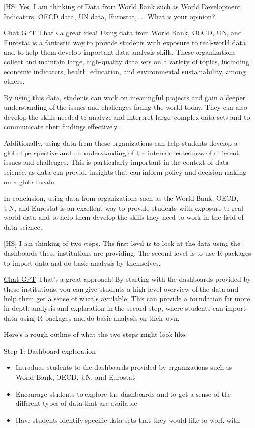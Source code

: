 \documentclass[
]{bxjsbook}
\providecommand{\tightlist}{%
  \setlength{\itemsep}{0pt}\setlength{\parskip}{0pt}}
\theoremstyle{definition}
\theoremstyle{definition}
\theoremstyle{definition}
\theoremstyle{definition}
\theoremstyle{remark}
\begin{document}
{[}HS{]} Yes. I am thinking of Data from World Bank such as World Development Indicators, OECD data, UN data, Eurostat, \ldots. What is your opinion?

\protect\hyperlink{chatgpt}{Chat GPT} That's a great idea! Using data from World Bank, OECD, UN, and Eurostat is a fantastic way to provide students with exposure to real-world data and to help them develop important data analysis skills. These organizations collect and maintain large, high-quality data sets on a variety of topics, including economic indicators, health, education, and environmental sustainability, among others.

By using this data, students can work on meaningful projects and gain a deeper understanding of the issues and challenges facing the world today. They can also develop the skills needed to analyze and interpret large, complex data sets and to communicate their findings effectively.

Additionally, using data from these organizations can help students develop a global perspective and an understanding of the interconnectedness of different issues and challenges. This is particularly important in the context of data science, as data can provide insights that can inform policy and decision-making on a global scale.

In conclusion, using data from organizations such as the World Bank, OECD, UN, and Eurostat is an excellent way to provide students with exposure to real-world data and to help them develop the skills they need to work in the field of data science.

{[}HS{]} I am thinking of two steps. The first level is to look at the data using the dashboards these institutions are providing. The second level is to use R packages to import data and do basic analysis by themselves.

\protect\hyperlink{chatgpt}{Chat GPT} That's a great approach! By starting with the dashboards provided by these institutions, you can give students a high-level overview of the data and help them get a sense of what's available. This can provide a foundation for more in-depth analysis and exploration in the second step, where students can import data using R packages and do basic analysis on their own.

Here's a rough outline of what the two steps might look like:

Step 1: Dashboard exploration

\begin{itemize}
\tightlist
\item
  Introduce students to the dashboards provided by organizations such as World Bank, OECD, UN, and Eurostat
\item
  Encourage students to explore the dashboards and to get a sense of the different types of data that are available
\item
  Have students identify specific data sets that they would like to work with
\end{itemize}
\end{document}
